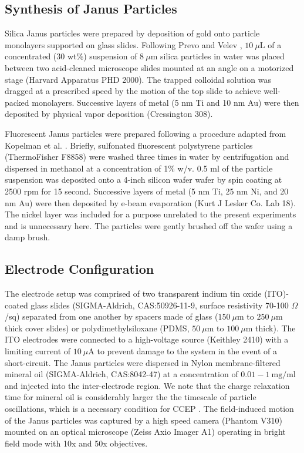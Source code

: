 \subsection{Synthesis of Janus Particles}

Silica Janus particles were prepared by  deposition of gold onto particle monolayers supported on glass slides.
Following Prevo and Velev \autocite{prevo2004controlled}, $10~\mu\text{L}$ of a concentrated (30 wt\%) suspension of $8~\mu\text{m}$ silica particles in water was placed between two acid-cleaned microscope slides mounted at an angle on a motorized stage (Harvard Apparatus PHD 2000).
The trapped colloidal solution was dragged at a prescribed speed by the motion of the top slide to achieve well-packed monolayers.
Successive layers of metal (5 nm Ti and 10 nm Au) were then deposited by physical vapor deposition (Cressington 308).

Fluorescent Janus particles were prepared following a procedure adapted from Kopelman et al. \autocite{Sinn2011}.
Briefly, sulfonated fluorescent polystyrene particles (ThermoFisher F8858) were washed three times in water by centrifugation and dispersed in methanol at a concentration of 1\% w/v. 
0.5 ml of the particle suspension was deposited onto a 4-inch silicon wafer wafer by spin coating at 2500 rpm for 15 second. 
Successive layers of metal (5 nm Ti, 25 nm Ni, and 20 nm Au) were then deposited by e-beam evaporation (Kurt J Lesker Co. Lab 18). 
The nickel layer was included for a purpose unrelated to the present experiments and is unnecessary here. 
The particles were gently brushed off the wafer using a damp brush.

\subsection{Electrode Configuration}

The electrode setup was comprised of two transparent  indium tin oxide (ITO)-coated glass slides (SIGMA-Aldrich, CAS:50926-11-9, surface resistivity 70-100 $\Omega$/sq) separated from one another by spacers made of glass ($150~\mu\text{m}$ to $250~\mu\text{m}$ thick cover slides) or polydimethylsiloxane (PDMS, $50~\mu\text{m}$ to $100~\mu\text{m}$ thick).
The ITO electrodes were connected to a high-voltage source (Keithley 2410) with a limiting current of $10~\mu\text{A}$ to prevent damage to the system in the event of a short-circuit.
The Janus particles were dispersed in Nylon membrane-filtered mineral oil (SIGMA-Aldrich, CAS:8042-47) at a concentration of $0.01-1~\text{mg/ml}$ and injected into the inter-electrode region.
We note that the charge relaxation time for mineral oil is considerably larger the the timescale of particle oscillations, which is a necessary condition for CCEP \autocite{cartier2014microfluidic}. 
The field-induced motion of the Janus particles was captured by a high speed camera (Phantom V310) mounted on an optical microscope (Zeiss Axio Imager A1) operating in bright field mode with 10x and 50x objectives.

